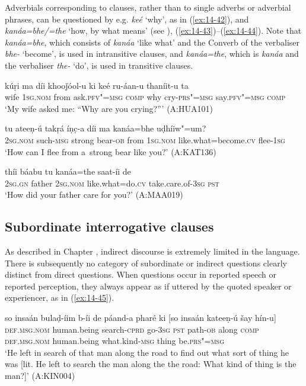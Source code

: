 Adverbials corresponding to clauses, rather than to single adverbs or adverbial phrases, can be questioned by e.g. \textit{keé} `why', as in (\ref{ex:14-42}), and \textit{kanáa=bhe/=the} `how, by what means' (see ), (\ref{ex:14-43})--(\ref{ex:14-44}). Note that \textit{kanáa=bhe}, which consists of \textit{kanáa} `like what' and the Converb of the verbaliser \textit{bhe-} `become', is used in intransitive clauses, and \textit{kanáa=the}, which is \textit{kanáa} and the verbaliser \textit{the-} `do', is used in transitive clauses.

\begin{exe}
\ex
\label{ex:14-42}
\gll kúṛi ma díi khooǰóol-u ki keé  ru-áan-u thaníit-u ta \\
wife \textsc{1sg.nom} from ask.\textsc{pfv"=msg} \textsc{comp} why  cry-\textsc{prs"=msg} say.\textsc{pfv"=msg} \textsc{comp}\\
\glt `My wife asked me: ``Why are you crying?''' (A:HUA101)

\ex
\label{ex:14-43}
\gll tu ateeṇ-ú takṛá íṇc̣-a díi ma  kanáa=bhe uḍhíiw"=um? \\
\textsc{2sg.nom} such-\textsc{msg} strong bear-\textsc{ob} from \textsc{1sg.nom}  like.what=become.\textsc{cv} flee-\textsc{1sg} \\
\glt `How can I flee from a~strong bear like you?' (A:KAT136)

\ex
\label{ex:14-44}
\gll thíi báabu tu kanáa=the saat-íi de \\
\textsc{2sg.gn} father \textsc{2sg.nom} like.what=do.\textsc{cv} take.care.of-\textsc{3sg} \textsc{pst} \\
\glt `How did your father care for you?' (A:MAA019)
\end{exe}

\subsection{Subordinate interrogative clauses}
\label{subsec:14-2-3}


As described in Chapter , indirect discourse is extremely limited in the language. There is subsequently no category of subordinate or indirect questions clearly distinct from direct questions. When questions occur in reported speech or reported perception, they always appear as if uttered by the quoted speaker or experiencer, as in (\ref{ex:14-45}).

\begin{exe}
\ex
\label{ex:14-45}
\gll so insaán bulaḍ-íim b-íi de  páand-a pharé ki [so insaán  kateeṇ-ú šay hín-u] \\
\textsc{def.msg.nom} human.being search-\textsc{cprd} go-\textsc{3sg} \textsc{pst} path-\textsc{ob} along \textsc{comp} \textsc{def.msg.nom} human.being what.kind-\textsc{msg} thing be.\textsc{prs"=msg } \\
\glt `He left in search of that man along the road to find out what sort of thing he was [lit. He left to search the man along the the road: What kind of thing is the man?]' (A:KIN004)
\end{exe}

